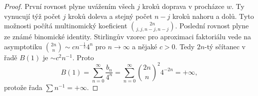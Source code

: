 \documentclass[../main.tex]{subfiles}
\begin{document}
\begin{proof}
    První rovnost plyne uvážením všech $j$ kroků doprava v procházce $w$. Ty vynucují týž počet $j$ kroků doleva a stejný počet $n-j$ kroků nahoru a dolů.
    Tyto možnosti počítá multinomický koeficient $\binom{2n}{j,j,n-j,n-j}$. Poslední rovnost plyne ze známé binomické identity. Stirlingův vzorec pro aproximaci faktoriálu vede na
    asymptotiku $\binom{2n}{n} \sim cn^{-\frac{1}{2}}4^n$ pro $n \to \infty$ a nějaké $c > 0$. Tedy $2n$-tý sčítanec v řadě $B(1)$ je $\sim c^2n^{-1}$. Proto
    \[ B(1) = \sum_{n=0}^\infty \frac{b_{n}}{4^{n}} = \sum_{n=0}^\infty \binom{2n}{n}^2 4^{-2n} = +\infty, \]
    protože řada $\sum n^{-1} = +\infty$.
\end{proof}
\end{document}
